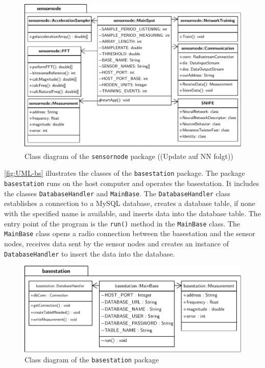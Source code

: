 \documentclass[12pt,a4paper]{scrartcl}
\begin{document}
\begin{figure}[htbp]
    \centering
    \includegraphics[width = \textwidth]{figures/uml-sensornode.pdf}
    \caption{Class diagram of the \texttt{sensornode} package ((Update auf NN folgt))}
    \label{fig:UML-sn}
\end{figure}

\autoref{fig:UML-bs} illustrates the classes of the \texttt{base\-station} package.
The package \texttt{base\-station} runs on the host computer and operates the basestation.
It includes the classes \texttt{Database\-Handler} and \texttt{Main\-Base}.
The \texttt{Database\-Handler} class establishes a connection to a MySQL database, creates a database table, if none with the specified name is available, and inserts data into the database table.
The entry point of the program is the \texttt{run()} method in the \texttt{Main\-Base} class. The \texttt{Main\-Base} class opens a radio connection between the basestation and the sensor nodes, receives data sent by the sensor nodes and creates an instance of \texttt{Database\-Handler} to insert the data into the database.

\begin{figure}[htbp]
    \centering
    \includegraphics[width = \textwidth]{figures/uml-basestation.pdf}
    \caption{Class diagram of the \texttt{basestation} package}
    \label{fig:UML-bs}
\end{figure}
\end{document}
